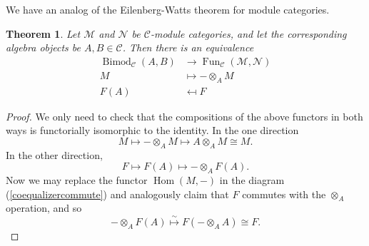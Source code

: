 \documentclass[11pt]{book}
\newtheorem{theorem}{Theorem}[section]
\theoremstyle{Rem}
\theoremstyle{definition}
\numberwithin{equation}{section}
\newcommand\ot{\otimes}
\newcommand\Bimod{\operatorname{Bimod}}
\newcommand\Fun{\operatorname{Fun}}
\newcommand\Hom{\operatorname{Hom}}
\newcommand\M{\mathcal{M}}
\newcommand\NN{\mathcal{N}}
\newcommand\C{\mathcal C}
\begin{document}
We have an analog of the Eilenberg-Watts theorem for module categories.
\begin{theorem}\label{eilenberg-watts}
Let $\M$ and $\NN$ be $\C$-module categories, and let the corresponding algebra objects be $A, B\in \C$. Then there is an equivalence \begin{align}
	\Bimod_\C(A, B) &\rightarrow \Fun_\C(\M, \NN)\\
	M &\mapsto -\otimes_A M \\
	F(A) &\mapsfrom F
\end{align}
\end{theorem}
\begin{proof}
We only need to check that the compositions of the above functors in both ways is functorially isomorphic to the identity. In the one direction \begin{equation}
	M\mapsto -\otimes_A M \mapsto A\otimes_A M \cong  M.
\end{equation} In the other direction, \begin{equation}
	F\mapsto F(A) \mapsto -\otimes_A F(A).
\end{equation} Now we may replace the functor $\Hom(M, -)$ in the diagram (\ref{coequalizercommute}) and analogously claim that $F$ commutes with the $\ot_A$ operation, and so\begin{equation}
	-\otimes_A F(A) \overset{\sim}\longmapsto F(-\otimes_A A) \cong F.
\end{equation}
\end{proof}
\end{document}
